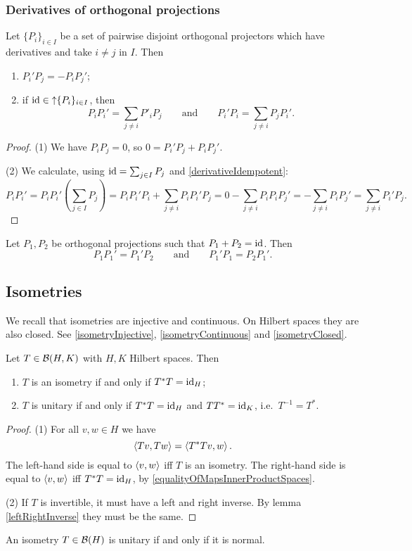 \subsubsection{Derivatives of orthogonal projections}



\begin{proposition}
Let $\{P_i\}_{i\in I}$ be a set of pairwise disjoint orthogonal projectors which have derivatives and take $i\neq j$ in $I$. Then
\begin{enumerate}
\item $P_i'P_j = - P_iP_j'$;
\item if $\operatorname{id} \in \operatorname{\uparrow} \{P_i\}_{i\in I}$, then
\[ P_iP_i' = \sum_{j\neq i}P'_iP_j \qquad\text{and}\qquad P_i'P_i = \sum_{j\neq i}P_jP_i'. \]
\end{enumerate}
\end{proposition}
\begin{proof}
(1) We have $P_iP_j = 0$, so $0 = P_i'P_j + P_iP_j'$.

(2) We calculate, using $\operatorname{id} = \sum_{j\in I}P_j$ and \ref{derivativeIdempotent}:
\[ P_iP_i' = P_iP_i'\left(\sum_{j\in I}P_j\right) = P_iP_i'P_i + \sum_{j\neq i}P_iP_i'P_j = 0 - \sum_{j\neq i}P_iP_iP_j' = -\sum_{j\neq i}P_iP_j' = \sum_{j\neq i}P_i'P_j. \]
\end{proof}
\begin{corollary}
Let $P_1, P_2$ be orthogonal projections such that $P_1 + P_2 = \operatorname{id}$. Then
\[ P_1P_1'= P_1'P_2 \qquad \text{and}\qquad P_1'P_1 = P_2P_1'. \]
\end{corollary}


\subsection{Isometries}
We recall that isometries are injective and continuous. On Hilbert spaces they are also closed. See \ref{isometryInjective}, \ref{isometryContinuous} and \ref{isometryClosed}.

\begin{proposition} \label{isometryCharacterisation}
Let $T\in \operatorname{\mathcal{B}}(H,K)$ with $H,K$ Hilbert spaces. Then
\begin{enumerate}
\item $T$ is an isometry \textup{if and only if} $T^*T = \operatorname{id}_H$;
\item $T$ is unitary \textup{if and only if} $T^*T = \operatorname{id}_H$ and $TT^* = \operatorname{id}_K$, i.e.\ $T^{-1} = T^*$.
\end{enumerate}
\end{proposition}
\begin{proof}
(1) For all $v,w\in H$ we have
\[ \left\langle Tv,Tw \right\rangle = \left\langle T^*Tv,w \right\rangle. \]
The left-hand side is equal to $\left\langle v,w \right\rangle$ iff $T$ is an isometry. The right-hand side is equal to $\left\langle v,w \right\rangle$ iff $T^*T = \operatorname{id}_H$, by \ref{equalityOfMapsInnerProductSpaces}.

(2) If $T$ is invertible, it must have a left and right inverse. By lemma \ref{leftRightInverse} they must be the same.
\end{proof}
\begin{corollary}
An isometry $T\in\operatorname{\mathcal{B}}(H)$ is unitary \textup{if and only if} it is normal.
\end{corollary}

